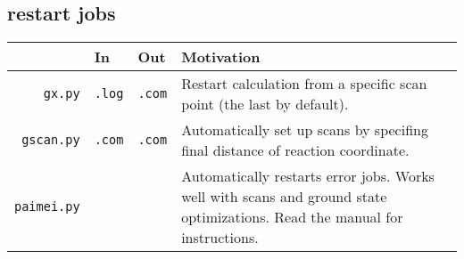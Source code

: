 \documentclass[11pt,a4paper]{article}
\begin{document}
\subsection{restart jobs}
\begin{tabular}{|r|C{2.5cm}|C{1.5cm}|C{8cm}|}
    \hline
     & In & Out & Motivation \\
    \hline
    \texttt{gx.py} & \texttt{.log} & \texttt{.com} &
Restart calculation from a specific scan point (the last by default). \\
    \hline
    \texttt{gscan.py} & \texttt{.com} & \texttt{.com} & 
    Automatically set up scans by specifing final distance of
    reaction coordinate.\\
    \hline
    \texttt{paimei.py} &  &  & Automatically restarts error jobs.
Works well with scans and ground state optimizations. Read the manual for
    instructions. \\
    \hline
\end{tabular}



\end{document}
